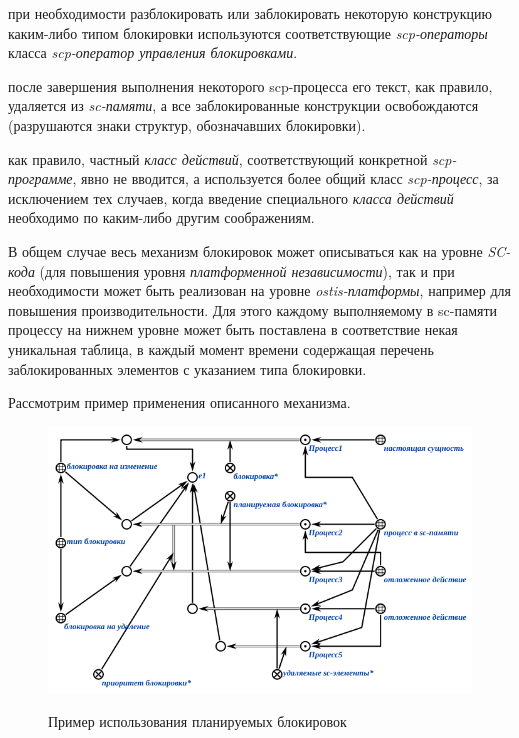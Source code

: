 \begin{textitemize}
\item при необходимости разблокировать или заблокировать некоторую конструкцию каким-либо типом блокировки используются соответствующие \textit{scp-операторы} класса \textit{scp-оператор управления блокировками}.
\item после завершения выполнения некоторого scp-процесса его текст, как правило, удаляется из \textit{sc-памяти}, а все заблокированные конструкции освобождаются (разрушаются знаки структур, обозначавших блокировки).
\item как правило, частный \textit{класс действий}, соответствующий конкретной \textit{scp-программе}, явно не вводится, а используется более общий класс \textit{scp-процесс}, за исключением тех случаев, когда введение	специального \textit{класса действий} необходимо по каким-либо другим соображениям.
\end{textitemize}

В общем случае весь механизм блокировок может описываться как на уровне \textit{SC-кода} (для повышения уровня \textit{платформенной независимости}), так и при необходимости может быть реализован на уровне \textit{ostis-платформы}, например для повышения производительности. Для этого каждому выполняемому в sc-памяти процессу на нижнем уровне может быть поставлена в соответствие некая уникальная таблица, в каждый момент времени содержащая перечень заблокированных элементов с указанием типа блокировки.

Рассмотрим пример применения описанного механизма.

\begin{figure}[H]
	\centering
	\caption{Пример использования планируемых блокировок}
	\includegraphics[scale=0.8]{images/part3/chapter_situation_management/plan_lock_1.png}
	\label{fig:plan_lock_1}
\end{figure}

